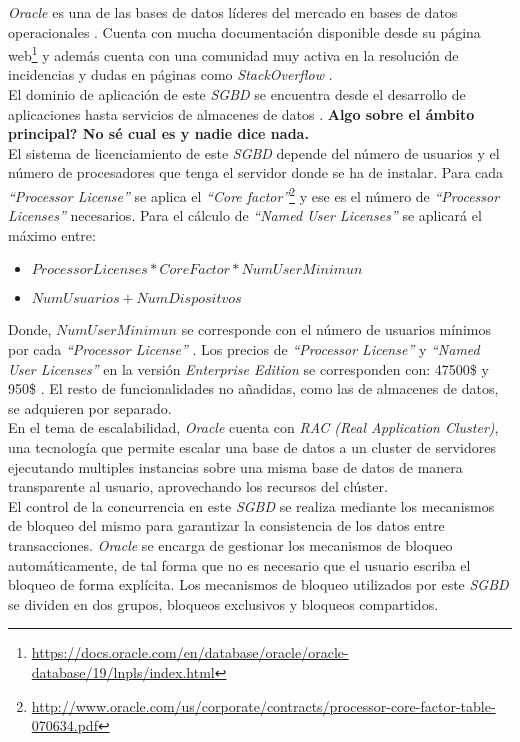 \documentclass[11pt,a4paper]{article}
\begin{document}
\emph{Oracle} es una de las bases de datos líderes del mercado en bases de datos operacionales \cite{GART:1}. Cuenta con mucha documentación disponible desde su página web\footnote{\url{https://docs.oracle.com/en/database/oracle/oracle-database/19/lnpls/index.html}} y además cuenta con una comunidad muy activa en la resolución de incidencias y dudas en páginas como \emph{StackOverflow} \cite{STO:1}.\\

El dominio de aplicación de este \emph{SGBD} se encuentra desde el desarrollo de aplicaciones hasta servicios de almacenes de datos \cite{ORA:2}. 
\textbf{{\LARGE Algo sobre el ámbito principal? No sé cual es y nadie dice nada.}}\\

El sistema de licenciamiento de este \emph{SGBD} depende del número de usuarios y el número de procesadores que tenga el servidor donde se ha de instalar. Para cada \emph{``Processor License''} se aplica el \emph{``Core factor''}\footnote{\url{http://www.oracle.com/us/corporate/contracts/processor-core-factor-table-070634.pdf}} y ese es el número de \emph{``Processor Licenses''} necesarios. Para el cálculo de \emph{``Named User Licenses''} se aplicará el máximo entre:

\begin{itemize}
\item $ProcessorLicenses * CoreFactor * NumUserMinimun$
\item $NumUsuarios + NumDispositvos$
\end{itemize}

Donde, $NumUserMinimun$ se corresponde con el número de usuarios mínimos por cada \emph{``Processor License''} \cite{ORA:3}. Los precios de \emph{``Processor License''} y \emph{``Named User Licenses''} en la versión \emph{Enterprise Edition} se corresponden con: 47500\$ y 950\$ \cite{ORA:4}. El resto de funcionalidades no añadidas, como las de almacenes de datos, se adquieren por separado. \\

En el tema de escalabilidad, \emph{Oracle} cuenta con \emph{RAC (Real Application Cluster)}, una tecnología que permite escalar una base de datos a un cluster de servidores ejecutando multiples instancias sobre una misma base de datos de manera transparente al usuario, aprovechando los recursos del clúster. \cite{ORA:5} \\

El control de la concurrencia en este \emph{SGBD} se realiza mediante los mecanismos de bloqueo del mismo para garantizar la consistencia de los datos entre transacciones. \emph{Oracle} se encarga de gestionar los mecanismos de bloqueo automáticamente, de tal forma que no es necesario que el usuario escriba el bloqueo de forma explícita.\cite{ORA:6}
Los mecanismos de bloqueo utilizados por este \emph{SGBD} se dividen en dos grupos, bloqueos exclusivos y bloqueos compartidos. \cite{ORA:7} \\
\end{document}
